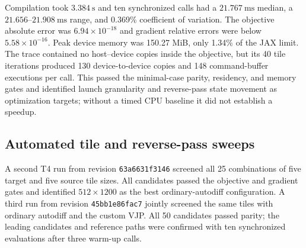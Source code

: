 \documentclass[11pt,a4paper]{article}
\newcommand{\code}[1]{\texttt{#1}}
\begin{document}
Compilation took $3.384\ \mathrm{s}$ and ten synchronized calls had a
$21.767\ \mathrm{ms}$ median, a $21.656$--$21.908\ \mathrm{ms}$ range, and
0.369\% coefficient of variation.  The objective absolute error was
$6.94\times10^{-18}$ and gradient relative errors were below
$5.58\times10^{-16}$.  Peak device memory was 150.27 MiB, only 1.34\% of the
JAX limit.  The trace contained no
host--device copies inside the objective, but its 40 tile iterations produced
130 device-to-device copies and 148 command-buffer executions per call.  This
passed the minimal-case parity, residency, and memory gates and identified
launch granularity and reverse-pass state movement as optimization targets;
without a timed CPU baseline it did not establish a speedup.

\subsection{Automated tile and reverse-pass sweeps}

A second T4 run from revision \code{63a6631f3146} screened all 25 combinations
of five target and five source tile sizes.  All candidates passed the objective
and gradient gates and identified $512\times1200$ as the best ordinary-autodiff
configuration.  A third run from revision \code{45bb1e86fac7} jointly screened
the same tiles with ordinary autodiff and the custom VJP.  All 50 candidates
passed parity; the leading candidates and reference paths were confirmed with
ten synchronized evaluations after three warm-up calls.
\end{document}
